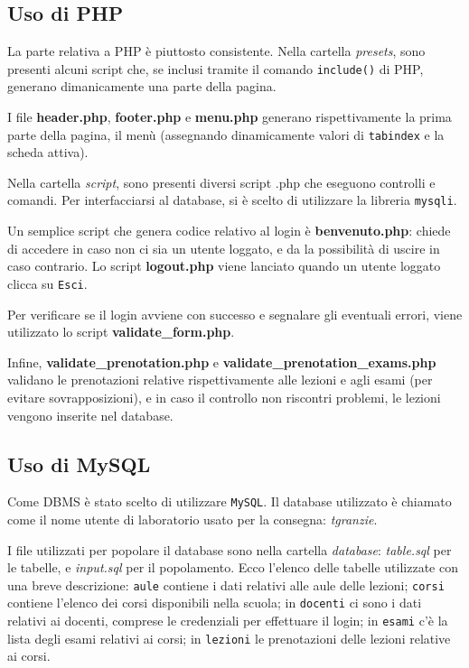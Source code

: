 \documentclass[12pt, a4paper]{article}
\begin{document}
\subsection{Uso di PHP}
La parte relativa a PHP è piuttosto consistente. Nella cartella \textit{presets}, sono presenti 
alcuni script che, se inclusi tramite il comando \texttt{include()} di PHP, generano dimanicamente
una parte della pagina. \par
\smallskip
I file \textbf{header.php}, \textbf{footer.php} e \textbf{menu.php} generano rispettivamente la prima 
parte della pagina, il menù (assegnando dinamicamente valori di \texttt{tabindex} e la scheda attiva). \par
\smallskip
Nella cartella \textit{script}, sono presenti diversi script .php che eseguono controlli e comandi. Per interfacciarsi al database, si è scelto di utilizzare la libreria \texttt{mysqli}.\par
\smallskip
Un semplice script che genera codice relativo al login è \textbf{benvenuto.php}: chiede di accedere
in caso non ci sia un utente loggato, e da la possibilità di uscire in caso contrario. Lo script \textbf{logout.php} viene lanciato quando un utente loggato clicca su \texttt{Esci}. \par
Per verificare se il login avviene con successo e segnalare
gli eventuali errori, viene utilizzato lo script \textbf{validate\_form.php}. \par
Infine, \mbox{\textbf{validate\_prenotation.php}} e \mbox{\textbf{validate\_prenotation\_exams.php}} 
validano le prenotazioni relative rispettivamente alle lezioni e agli esami (per 
evitare sovrapposizioni), e in caso il controllo non riscontri problemi, le lezioni vengono inserite nel database.



\subsection{Uso di MySQL}
Come DBMS è stato scelto di utilizzare \texttt{MySQL}. Il database utilizzato è chiamato 
come il nome utente di laboratorio usato per la consegna: \textit{tgranzie}.\par 
I file utilizzati per popolare il database sono nella cartella \mbox{\textit{database}}:
\mbox{\textit{table.sql}} per le tabelle, e \mbox{\textit{input.sql}} per il popolamento. 
Ecco l'elenco delle tabelle utilizzate con una breve descrizione: \texttt{aule} contiene 
i dati relativi alle aule delle lezioni; \texttt{corsi} 
contiene l'elenco dei corsi disponibili nella scuola; in \texttt{docenti} ci sono i dati relativi 
ai docenti, comprese le credenziali per effettuare il login; in \texttt{esami} c'è la lista degli
esami relativi ai corsi; in \texttt{lezioni} le prenotazioni delle lezioni relative ai corsi.
\end{document}
